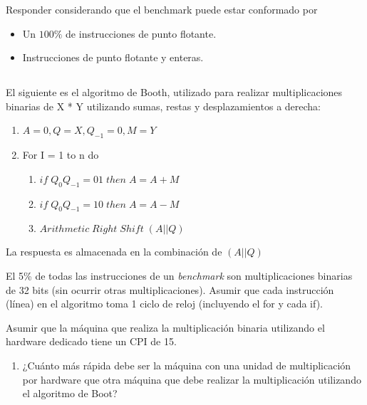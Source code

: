 Responder considerando que el benchmark puede estar conformado por 
	
\begin{itemize}
    \item Un $100\%$ de instrucciones de punto flotante.
    \item Instrucciones de punto flotante y enteras.
\end{itemize}

\subsection{}
El siguiente es el algoritmo de Booth, utilizado para realizar multiplicaciones binarias de X * Y utilizando sumas, restas y desplazamientos a derecha:

   \begin{enumerate}
    \item \begin{math} A=0, Q=X, Q_{-1}=0, M=Y \end{math}
    \item For I = 1 to n do
          \begin{enumerate}
           \item \begin{math} if\; Q_{0}Q_{-1} = 01\; then\; A=A + M \end{math}
	   \item \begin{math} if\; Q_{0}Q_{-1} = 10\; then\; A=A - M \end{math}
           \item \begin{math} Arithmetic\; Right\; Shift\; (A || Q)\end{math}
           \end{enumerate}
   \end{enumerate}
   La respuesta es almacenada en la combinación de  \begin{math}(A || Q)\end{math}

   El 5\% de todas las instrucciones de un \textit{benchmark} son multiplicaciones binarias de 32 bits (sin ocurrir otras multiplicaciones).
   Asumir que cada instrucción (línea) en el algoritmo toma 1 ciclo de reloj (incluyendo el for y cada if).
   
   Asumir que la máquina que realiza la multiplicación binaria utilizando el hardware dedicado tiene un CPI de 15.

   \begin{enumerate}[label=\alph*)]
    \item ¿Cuánto más rápida debe ser la máquina con una unidad de multiplicación por hardware que otra máquina que debe realizar la multiplicación utilizando el algoritmo de Boot?
   \end{enumerate}

